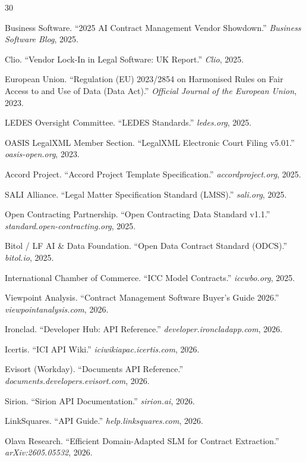 \documentclass[11pt,a4paper]{article}
\begin{document}
\begin{thebibliography}{30}

Business Software. ``2025 AI Contract Management Vendor Showdown.'' \textit{Business Software Blog}, 2025.

Clio. ``Vendor Lock-In in Legal Software: UK Report.'' \textit{Clio}, 2025.

European Union. ``Regulation (EU) 2023/2854 on Harmonised Rules on Fair Access to and Use of Data (Data Act).'' \textit{Official Journal of the European Union}, 2023.

LEDES Oversight Committee. ``LEDES Standards.'' \textit{ledes.org}, 2025.

OASIS LegalXML Member Section. ``LegalXML Electronic Court Filing v5.01.'' \textit{oasis-open.org}, 2023.

Accord Project. ``Accord Project Template Specification.'' \textit{accordproject.org}, 2025.

SALI Alliance. ``Legal Matter Specification Standard (LMSS).'' \textit{sali.org}, 2025.

Open Contracting Partnership. ``Open Contracting Data Standard v1.1.'' \textit{standard.open-contracting.org}, 2025.

Bitol / LF AI \& Data Foundation. ``Open Data Contract Standard (ODCS).'' \textit{bitol.io}, 2025.

International Chamber of Commerce. ``ICC Model Contracts.'' \textit{iccwbo.org}, 2025.

Viewpoint Analysis. ``Contract Management Software Buyer's Guide 2026.'' \textit{viewpointanalysis.com}, 2026.

Ironclad. ``Developer Hub: API Reference.'' \textit{developer.ironcladapp.com}, 2026.

Icertis. ``ICI API Wiki.'' \textit{iciwikiapac.icertis.com}, 2026.

Evisort (Workday). ``Documents API Reference.'' \textit{documents.developers.evisort.com}, 2026.

Sirion. ``Sirion API Documentation.'' \textit{sirion.ai}, 2026.

LinkSquares. ``API Guide.'' \textit{help.linksquares.com}, 2026.

Olava Research. ``Efficient Domain-Adapted SLM for Contract Extraction.'' \textit{arXiv:2605.05532}, 2026.


\end{thebibliography}
\end{document}
